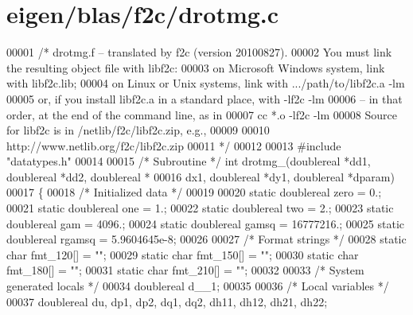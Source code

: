 \hypertarget{eigen_2blas_2f2c_2drotmg_8c_source}{}\section{eigen/blas/f2c/drotmg.c}
\label{eigen_2blas_2f2c_2drotmg_8c_source}

\begin{DoxyCode}
00001 \textcolor{comment}{/* drotmg.f -- translated by f2c (version 20100827).}
00002 \textcolor{comment}{   You must link the resulting object file with libf2c:}
00003 \textcolor{comment}{    on Microsoft Windows system, link with libf2c.lib;}
00004 \textcolor{comment}{    on Linux or Unix systems, link with .../path/to/libf2c.a -lm}
00005 \textcolor{comment}{    or, if you install libf2c.a in a standard place, with -lf2c -lm}
00006 \textcolor{comment}{    -- in that order, at the end of the command line, as in}
00007 \textcolor{comment}{        cc *.o -lf2c -lm}
00008 \textcolor{comment}{    Source for libf2c is in /netlib/f2c/libf2c.zip, e.g.,}
00009 \textcolor{comment}{}
00010 \textcolor{comment}{        http://www.netlib.org/f2c/libf2c.zip}
00011 \textcolor{comment}{*/}
00012 
00013 \textcolor{preprocessor}{#include "datatypes.h"}
00014 
00015 \textcolor{comment}{/* Subroutine */} \textcolor{keywordtype}{int} drotmg\_(doublereal *dd1, doublereal *dd2, doublereal *
00016     dx1, doublereal *dy1, doublereal *dparam)
00017 \{
00018     \textcolor{comment}{/* Initialized data */}
00019 
00020     \textcolor{keyword}{static} doublereal zero = 0.;
00021     \textcolor{keyword}{static} doublereal one = 1.;
00022     \textcolor{keyword}{static} doublereal two = 2.;
00023     \textcolor{keyword}{static} doublereal gam = 4096.;
00024     \textcolor{keyword}{static} doublereal gamsq = 16777216.;
00025     \textcolor{keyword}{static} doublereal rgamsq = 5.9604645e-8;
00026 
00027     \textcolor{comment}{/* Format strings */}
00028     \textcolor{keyword}{static} \textcolor{keywordtype}{char} fmt\_120[] = \textcolor{stringliteral}{""};
00029     \textcolor{keyword}{static} \textcolor{keywordtype}{char} fmt\_150[] = \textcolor{stringliteral}{""};
00030     \textcolor{keyword}{static} \textcolor{keywordtype}{char} fmt\_180[] = \textcolor{stringliteral}{""};
00031     \textcolor{keyword}{static} \textcolor{keywordtype}{char} fmt\_210[] = \textcolor{stringliteral}{""};
00032 
00033     \textcolor{comment}{/* System generated locals */}
00034     doublereal d\_\_1;
00035 
00036     \textcolor{comment}{/* Local variables */}
00037     doublereal du, dp1, dp2, dq1, dq2, dh11, dh12, dh21, dh22;

\end{DoxyCode}
